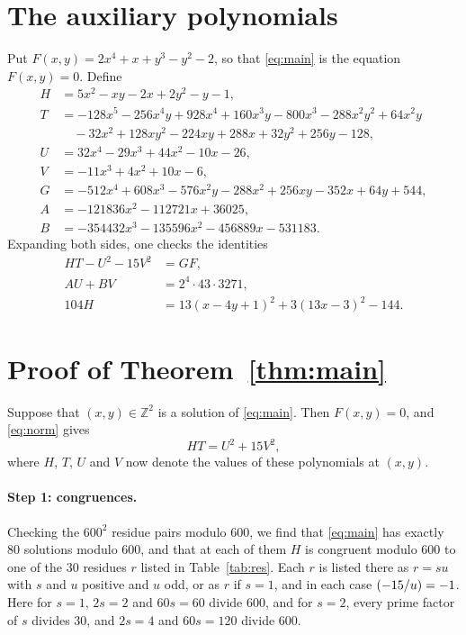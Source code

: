 \documentclass[11pt]{article}
\newcommand{\Z}{\mathbb{Z}}
\newcommand{\leg}[2]{\mathchoice{\biggl(\dfrac{#1}{#2}\biggr)}{(#1/#2)}{(#1/#2)}{(#1/#2)}}
\begin{document}
\section{The auxiliary polynomials}

Put $F(x,y)=2x^{4}+x+y^{3}-y^{2}-2$, so that \eqref{eq:main} is the equation $F(x,y)=0$. Define
\begin{align*}
H&=5x^{2}-xy-2x+2y^{2}-y-1,\\
T&=-128x^{5}-256x^{4}y+928x^{4}+160x^{3}y-800x^{3}-288x^{2}y^{2}+64x^{2}y\\
&\quad-32x^{2}+128xy^{2}-224xy+288x+32y^{2}+256y-128,\\
U&=32x^{4}-29x^{3}+44x^{2}-10x-26,\\
V&=-11x^{3}+4x^{2}+10x-6,\\
G&=-512x^{4}+608x^{3}-576x^{2}y-288x^{2}+256xy-352x+64y+544,\\
A&=-121836x^{2}-112721x+36025,\\
B&=-354432x^{3}-135596x^{2}-456889x-531183.
\end{align*}
Expanding both sides, one checks the identities
\begin{align}
HT-U^2-15V^2&=GF,\label{eq:norm}\\
AU+BV&=2^{4}\cdot 43\cdot 3271,\label{eq:bezout}\\
104H&=13(x-4y+1)^2+3(13x-3)^2-144.\label{eq:sign}
\end{align}

\section{Proof of Theorem~\ref{thm:main}}

Suppose that $(x,y)\in\Z^2$ is a solution of \eqref{eq:main}. Then $F(x,y)=0$, and \eqref{eq:norm} gives
\begin{equation}\label{eq:HT}
HT=U^2+15V^2,
\end{equation}
where $H$, $T$, $U$ and $V$ now denote the values of these polynomials at $(x,y)$.

\paragraph{Step 1: congruences.} Checking the $600^2$ residue pairs modulo $600$, we find that \eqref{eq:main} has exactly 80 solutions modulo $600$, and that at each of them $H$ is congruent modulo $600$ to one of the 30 residues $r$ listed in Table~\ref{tab:res}. Each $r$ is listed there as $r=su$ with $s$ and $u$ positive and $u$ odd, or as $r$ if $s=1$, and in each case $\leg{-15}{u}=-1$. Here for $s=1$, $2s=2$ and $60s=60$ divide $600$, and for $s=2$, every prime factor of $s$ divides $30$, and $2s=4$ and $60s=120$ divide $600$.
\end{document}
